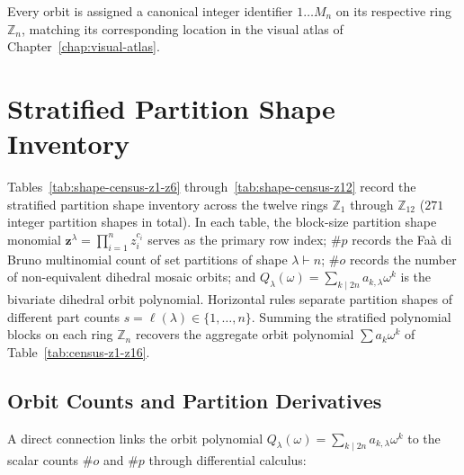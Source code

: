 Every orbit is assigned a canonical integer identifier $1 \dots M_n$ on its respective ring $\mathbb{Z}_n$, matching its corresponding location in the visual atlas of Chapter~\ref{chap:visual-atlas}.

\section{Stratified Partition Shape Inventory}

Tables~\ref{tab:shape-census-z1-z6} through~\ref{tab:shape-census-z12} record the stratified partition shape inventory across the twelve rings $\mathbb{Z}_1$ through $\mathbb{Z}_{12}$ ($271$ integer partition shapes in total). In each table, the block-size partition shape monomial $\mathbf{z}^\lambda = \prod_{i=1}^n z_i^{c_i}$ serves as the primary row index; $\#p$ records the Fa\`a di Bruno multinomial count of set partitions of shape $\lambda \vdash n$; $\#o$ records the number of non-equivalent dihedral mosaic orbits; and $Q_\lambda(\omega) = \sum_{k \mid 2n} a_{k,\lambda} \omega^k$ is the bivariate dihedral orbit polynomial. Horizontal rules separate partition shapes of different part counts $s = \ell(\lambda) \in \{1, \dots, n\}$. Summing the stratified polynomial blocks on each ring $\mathbb{Z}_n$ recovers the aggregate orbit polynomial $\sum a_k \omega^k$ of Table~\ref{tab:census-z1-z16}.

\subsection*{Orbit Counts and Partition Derivatives}

A direct connection links the orbit polynomial $Q_\lambda(\omega) = \sum_{k \mid 2n} a_{k,\lambda} \omega^k$ to the scalar counts $\#o$ and $\#p$ through differential calculus:


